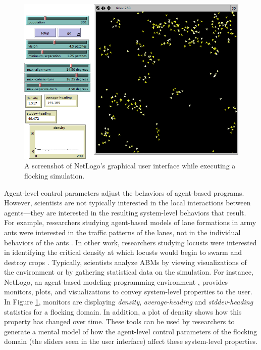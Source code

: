 \begin{figure}[ht]
\centering
\includegraphics[scale=.5]{images/netlogoui.png}
\caption{A screenshot of NetLogo's graphical user interface while executing a flocking simulation.}
\label{fig:netlogoui}
\end{figure}

Agent-level control parameters adjust the behaviors of agent-based programs.
However, scientists are not typically interested in the local interactions between agents---they are interested in the resulting system-level behaviors that result.
For example, researchers studying agent-based models of lane formations in army ants were interested in the traffic patterns of the lanes, not in the individual behaviors of the ants \cite{couzin2003sol}.
In other work, researchers studying locusts were interested in identifying the critical density at which locusts would begin to swarm and destroy crops \cite{buhl2006dom}.
Typically, scientists analyze ABMs by viewing visualizations of the environment or by gathering statistical data on the simulation.
For instance, NetLogo, an agent-based modeling programming environment \cite{tisue2004netlogo}, provides monitors, plots, and visualizations to convey system-level properties to the user.
In Figure \ref{fig:netlogoui}, monitors are displaying \textit{density}, \textit{average-heading} and \textit{stddev-heading} statistics for a flocking domain.
In addition, a plot of density shows how this property has changed over time.
These tools can be used by researchers to generate a mental model of how the agent-level control parameters of the flocking domain (the sliders seen in the user interface) affect these system-level properties.

